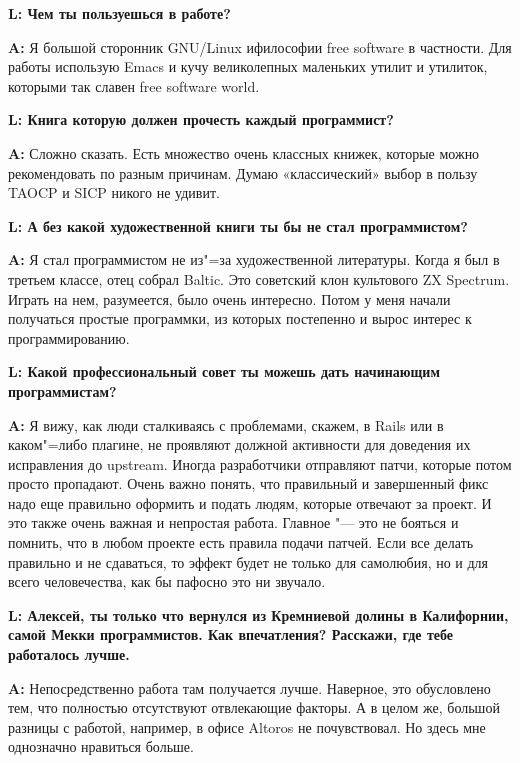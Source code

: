 \documentclass[10pt, a5paper]{article}
\begin{document}
{\noindent \bf L:  Чем ты пользуешься в работе?}

{\noindent \bf A:} Я большой сторонник GNU/Linux ифилософии free software в частности. Для работы использую Emacs и кучу великолепных маленьких утилит и утилиток, которыми так славен free software world.

{\noindent \bf L:  Книга которую должен прочесть каждый программист?}

{\noindent \bf A:} Сложно сказать. Есть множество очень классных книжек, которые можно рекомендовать по разным причинам. Думаю «классический» выбор в пользу TAOCP и SICP никого не удивит.

{\noindent \bf L:  А без какой художественной книги ты бы не стал программистом?}

{\noindent \bf A:} Я стал программистом не из"=за художественной литературы. Когда я был в третьем классе, отец собрал Baltic. Это советский клон культового ZX Spectrum. Играть на нем, разумеется, было очень интересно. Потом у меня начали получаться простые программки, из которых постепенно и вырос интерес к программированию.

{\noindent \bf L:  Какой профессиональный совет ты можешь дать начинающим программистам?}

{\noindent \bf A:} Я вижу, как люди сталкиваясь с проблемами, скажем, в Rails или в каком"=либо плагине, не проявляют должной активности для доведения их исправления до upstream. Иногда разработчики  отправляют патчи, которые потом просто пропадают. Очень важно понять, что правильный и завершенный фикс надо еще правильно оформить и подать людям, которые отвечают за проект. И это также очень важная и непростая работа. Главное "--- это не бояться и помнить, что в любом проекте есть правила подачи патчей. Если все делать правильно и не сдаваться, то эффект будет не только для самолюбия, но и для всего человечества, как бы пафосно это ни звучало.

{\noindent \bf L:  Алексей, ты только что вернулся из Кремниевой долины в Калифорнии, самой Мекки программистов. Как впечатления? Расскажи, где тебе работалось лучше.}

{\noindent \bf A:} Непосредственно работа там получается лучше. Наверное, это обусловлено тем, что полностью отсутствуют отвлекающие факторы. А в целом же, большой разницы с работой, например, в офисе Altoros не почувствовал. Но здесь мне однозначно нравиться больше. 

\newpage
~
\newpage
~
\newpage
~
\end{document}
